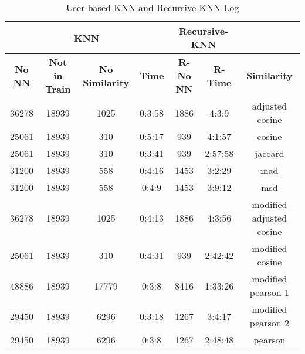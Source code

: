 \begin{table}[H]
\centering
\caption{User-based KNN and Recursive-KNN Log}
\label{table:users_log}
\begin{tabular}{|c|c|c|c|c|c|c|}
\cline{1-6}
\multicolumn{4}{|c|}{\textbf{KNN}}                                               & \multicolumn{2}{c|}{\textbf{Recursive-KNN}} & \multicolumn{1}{l}{}                          \\ \hline
\textbf{No NN} & \textbf{Not in Train} & \textbf{No Similarity} & \textbf{Time} & \textbf{R-No NN} & \textbf{R-Time}		& \multicolumn{1}{c|}{\textbf{Similarity}}      \\ \hline
36278          & 18939                 & 1025                  & 0:3:58        & 1886             & 4:3:9           		& \multicolumn{1}{c|}{adjusted cosine}          \\ \hline
25061          & 18939                 & 310                   & 0:5:17        & 939              & 4:1:57          		& \multicolumn{1}{c|}{cosine}                   \\ \hline
25061          & 18939                 & 310                   & 0:3:41        & 939              & 2:57:58         		& \multicolumn{1}{c|}{jaccard}                  \\ \hline
31200          & 18939                 & 558                   & 0:4:16        & 1453             & 3:2:29          		& \multicolumn{1}{c|}{mad}                      \\ \hline
31200          & 18939                 & 558                   & 0:4:9         & 1453             & 3:9:12          		& \multicolumn{1}{c|}{msd}                      \\ \hline
36278          & 18939                 & 1025                  & 0:4:13        & 1886             & 4:3:56          		& \multicolumn{1}{c|}{modified adjusted cosine} \\ \hline
25061          & 18939                 & 310                   & 0:4:31        & 939              & 2:42:42         		& \multicolumn{1}{c|}{modified cosine}          \\ \hline
48886          & 18939                 & 17779                 & 0:3:8         & 8416             & 1:33:26         		& \multicolumn{1}{c|}{modified pearson 1}       \\ \hline
29450          & 18939                 & 6296                  & 0:3:18        & 1267             & 3:4:17          		& \multicolumn{1}{c|}{modified pearson 2}       \\ \hline
29450          & 18939                 & 6296                  & 0:3:8         & 1267             & 2:48:48         		& \multicolumn{1}{c|}{pearson}                  \\ \hline
\end{tabular}
\end{table}

